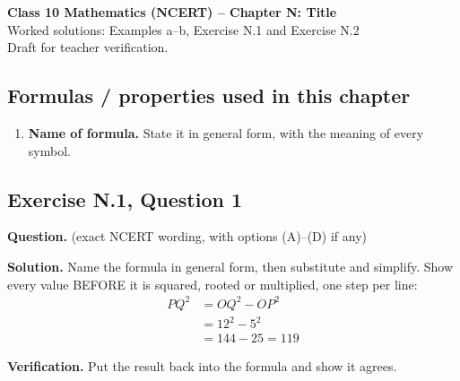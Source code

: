 \documentclass[11pt,a4paper]{article}
\begin{document}
\begin{center}
{\Large\bfseries Class 10 Mathematics (NCERT) -- Chapter N: Title}\\[4pt]
{\large Worked solutions: Examples a--b, Exercise N.1 and Exercise N.2}\\[2pt]
{\small Draft for teacher verification.}
\end{center}

\subsection*{Formulas / properties used in this chapter}
\begin{enumerate}[label=(F\arabic*),leftmargin=*]
\item \textbf{Name of formula.} State it in general form, with the meaning of every symbol.
\end{enumerate}

\subsection*{Exercise N.1, Question 1}
\textbf{Question.} (exact NCERT wording, with options (A)--(D) if any)


\textbf{Solution.} Name the formula in general form, then substitute and simplify.
Show every value BEFORE it is squared, rooted or multiplied, one step per line:
\begin{align*}
PQ^2&=OQ^2-OP^2\\
&=12^2-5^2\\
&=144-25=119
\end{align*}

\textbf{Verification.} Put the result back into the formula and show it agrees.


\end{document}
